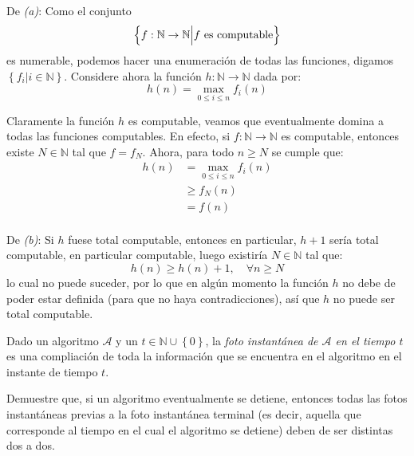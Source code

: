 \documentclass[12pt]{report}
\newcounter{it}
\theoremstyle{largebreak}
\newcommand\cf[3]{\ensuremath{#1:#2\rightarrow#3}}
\begin{document}
    \begin{sol}
        De \textit{(a)}: Como el conjunto
        \begin{equation*}
            \left\{\cf{f}{\mathbb{N}}{\mathbb{N}}\Big|f\textup{ es computable} \right\}
        \end{equation*}
        es numerable, podemos hacer una enumeración de todas las funciones, digamos $\left\{f_i\Big|i\in\mathbb{N} \right\}$.
        Considere ahora la función $\cf{h}{\mathbb{N}}{\mathbb{N}}$ dada por:
        \begin{equation*}
            h(n)=\max_{0\leq i\leq n}f_i(n)
        \end{equation*}
        
        Claramente la función $h$ es computable, veamos que eventualmente domina a todas las funciones computables. En efecto, si $\cf{f}{\mathbb{N}}{\mathbb{N}}$ es computable, entonces existe $N\in\mathbb{N}$ tal que $f=f_N$. Ahora, para todo $n\geq N$ se cumple que:
        \begin{equation*}
            \begin{split}
                h(n)&=\max_{ 0\leq i\leq n}f_i(n)\\
                &\geq f_N(n)\\
                &=f(n)\\
            \end{split}
        \end{equation*}

        De \textit{(b)}: Si $h$ fuese total computable, entonces en particular, $h+1$ sería total computable, en particular computable, luego existiría $N\in\mathbb{N}$ tal que:
        \begin{equation*}
            h(n)\geq h(n)+1,\quad\forall n\geq N
        \end{equation*}
        lo cual no puede suceder, por lo que en algún momento la función $h$ no debe de poder estar definida (para que no haya contradicciones), así que $h$ no puede ser total computable.
    \end{sol}

    \begin{excer}
        Dado un algoritmo $\mathcal{A}$ y un $t\in\mathbb{N}\cup\left\{0\right\}$, la \textit{foto instantánea de $\mathcal{A}$ en el tiempo $t$} es una compliación de toda la información que se encuentra en el algoritmo en el instante de tiempo $t$.

        Demuestre que, si un algoritmo eventualmente se detiene, entonces todas las fotos instantáneas previas a la foto instantánea terminal (es decir, aquella que corresponde al tiempo en el cual el algoritmo se detiene) deben de ser distintas dos a dos.
    \end{excer}
\end{document}
